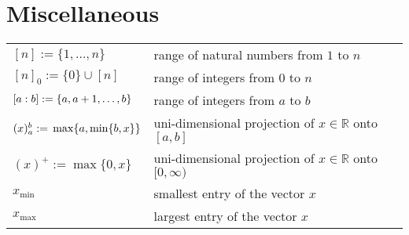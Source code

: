 \section*{Miscellaneous}

\nopagebreak\begin{tabularx}{\textwidth}{p{100pt}X}
    $[n] := \{1, \dots, n\}$ & range of natural numbers from $1$ to $n$ \\
    $[n]_0 := \{0\} \cup [n]$ & range of integers from $0$ to $n$ \\
    $[a : b] :=\newline \{a, a+1, \dots, b\}$ & range of integers from $a$ to $b$ \\
    $(x)_a^b :=\newline \max\{a, \min\{b, x\}\}$ & uni-dimensional projection of $x \in \mathbb{R}$ onto $[a,b]$ \\
    $(x)^+ := \max\{0, x\}$ & uni-dimensional projection of $x \in \mathbb{R}$ onto $[0, \infty)$ \\
    $x_{\text{min}}$ & smallest entry of the vector $x$ \\
    $x_{\text{max}}$ & largest entry of the vector $x$ \\
\end{tabularx}